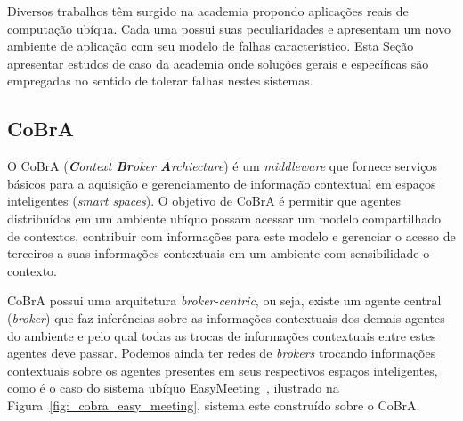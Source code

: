 Diversos trabalhos têm surgido na academia propondo aplicações reais de computação ubíqua. Cada uma possui suas peculiaridades e apresentam um novo ambiente de aplicação com seu modelo de falhas característico. Esta Seção apresentar estudos de caso da academia onde soluções gerais e específicas são empregadas no sentido de tolerar falhas nestes sistemas. %

\subsection{CoBrA} %
\label{sub:cobra}

O CoBrA (\emph{\textbf{C}ontext \textbf{Br}oker \textbf{A}rchiecture}) é um \emph{middleware} que fornece serviços básicos para a aquisição e gerenciamento de informação contextual em espaços inteligentes (\emph{smart spaces}). O objetivo de CoBrA é permitir que agentes distribuídos em um ambiente ubíquo possam acessar um modelo compartilhado de contextos, contribuir com informações para este modelo e gerenciar o acesso de terceiros a suas informações contextuais em um ambiente com sensibilidade o contexto.

CoBrA possui uma arquitetura \emph{broker-centric}, ou seja, existe um agente central (\emph{broker}) que faz inferências sobre as informações contextuais dos demais agentes do ambiente e pelo qual todas as trocas de informações contextuais entre estes agentes deve passar. Podemos ainda ter redes de \emph{brokers} trocando informações contextuais sobre os agentes presentes em seus respectivos espaços inteligentes, como é o caso do sistema ubíquo EasyMeeting~\cite{finin2005semantic}, ilustrado na Figura~\ref{fig:_cobra_easy_meeting}, sistema este construído sobre o CoBrA.

